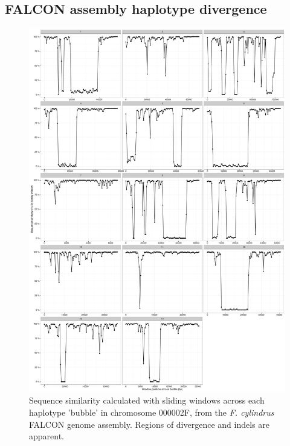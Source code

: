 \begin{appendices}

\chapter{FALCON assembly haplotype divergence}
\begin{figure}
\includegraphics[scale=1.0]{Figures/Fcylindrus/Diatom_FALCON_1-100_panels}
\caption{Sequence similarity calculated with sliding windows across each haplotype 'bubble' in chromosome 000002F, from the \textit{F. cylindrus} FALCON genome assembly.
Regions of divergence and indels are apparent. \label{fig:falconwindows}}
\end{figure}

\end{appendices}